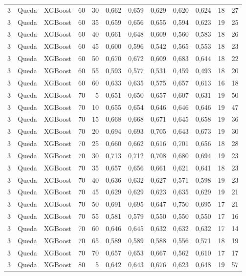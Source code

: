\begin{longtable}{@{}rllrrrrrrrrr@{}}
3 & Queda & XGBoost & 60 & 30 & 0,662 & 0,659 & 0,629 & 0,620 & 0,624 & 18 & 27 \\
3 & Queda & XGBoost & 60 & 35 & 0,659 & 0,656 & 0,655 & 0,594 & 0,623 & 19 & 25 \\
3 & Queda & XGBoost & 60 & 40 & 0,661 & 0,648 & 0,609 & 0,560 & 0,583 & 18 & 26 \\
3 & Queda & XGBoost & 60 & 45 & 0,600 & 0,596 & 0,542 & 0,565 & 0,553 & 18 & 23 \\
3 & Queda & XGBoost & 60 & 50 & 0,670 & 0,672 & 0,609 & 0,683 & 0,644 & 18 & 22 \\
3 & Queda & XGBoost & 60 & 55 & 0,593 & 0,577 & 0,531 & 0,459 & 0,493 & 18 & 20 \\
3 & Queda & XGBoost & 60 & 60 & 0,633 & 0,635 & 0,575 & 0,657 & 0,613 & 16 & 18 \\
3 & Queda & XGBoost & 70 & 5 & 0,651 & 0,650 & 0,657 & 0,607 & 0,631 & 19 & 50 \\
3 & Queda & XGBoost & 70 & 10 & 0,655 & 0,654 & 0,646 & 0,646 & 0,646 & 19 & 47 \\
3 & Queda & XGBoost & 70 & 15 & 0,668 & 0,668 & 0,671 & 0,645 & 0,658 & 19 & 36 \\
3 & Queda & XGBoost & 70 & 20 & 0,694 & 0,693 & 0,705 & 0,643 & 0,673 & 19 & 30 \\
3 & Queda & XGBoost & 70 & 25 & 0,660 & 0,662 & 0,616 & 0,701 & 0,656 & 18 & 28 \\
3 & Queda & XGBoost & 70 & 30 & 0,713 & 0,712 & 0,708 & 0,680 & 0,694 & 19 & 23 \\
3 & Queda & XGBoost & 70 & 35 & 0,657 & 0,656 & 0,661 & 0,621 & 0,641 & 18 & 23 \\
3 & Queda & XGBoost & 70 & 40 & 0,636 & 0,632 & 0,627 & 0,571 & 0,598 & 19 & 23 \\
3 & Queda & XGBoost & 70 & 45 & 0,629 & 0,629 & 0,623 & 0,635 & 0,629 & 19 & 21 \\
3 & Queda & XGBoost & 70 & 50 & 0,691 & 0,695 & 0,647 & 0,750 & 0,695 & 17 & 21 \\
3 & Queda & XGBoost & 70 & 55 & 0,581 & 0,579 & 0,550 & 0,550 & 0,550 & 17 & 16 \\
3 & Queda & XGBoost & 70 & 60 & 0,646 & 0,645 & 0,632 & 0,632 & 0,632 & 17 & 14 \\
3 & Queda & XGBoost & 70 & 65 & 0,589 & 0,589 & 0,588 & 0,556 & 0,571 & 18 & 19 \\
3 & Queda & XGBoost & 70 & 70 & 0,657 & 0,653 & 0,667 & 0,562 & 0,610 & 17 & 17 \\
3 & Queda & XGBoost & 80 & 5 & 0,642 & 0,643 & 0,676 & 0,623 & 0,648 & 19 & 57 \\

\end{longtable}
